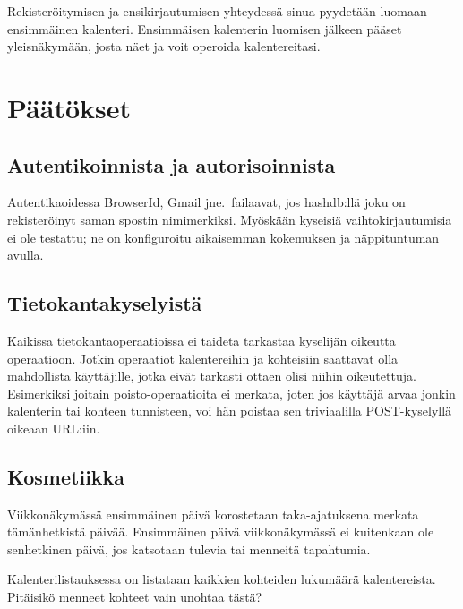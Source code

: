 \documentclass[a4paper,12pt]{report}
\begin{document}
Rekisteröitymisen ja ensikirjautumisen yhteydessä sinua pyydetään luomaan
ensimmäinen kalenteri. Ensimmäisen kalenterin luomisen jälkeen pääset
yleisnäkymään, josta näet ja voit operoida kalentereitasi.

\chapter{Päätökset}


\section*{Autentikoinnista ja autorisoinnista}
Autentikaoidessa BrowserId, Gmail jne.\ failaavat, jos hashdb:llä joku on
rekisteröinyt saman spostin nimimerkiksi.
Myöskään kyseisiä vaihtokirjautumisia ei ole testattu; ne on konfiguroitu
aikaisemman kokemuksen ja näppituntuman avulla.

\section*{Tietokantakyselyistä}
Kaikissa tietokantaoperaatioissa ei taideta tarkastaa kyselijän oikeutta
operaatioon. Jotkin operaatiot kalentereihin ja kohteisiin saattavat olla
mahdollista käyttäjille, jotka eivät tarkasti ottaen olisi niihin oikeutettuja.
Esimerkiksi joitain poisto-operaatioita ei merkata, joten jos käyttäjä arvaa
jonkin kalenterin tai kohteen tunnisteen, voi hän poistaa sen triviaalilla
POST-kyselyllä oikeaan URL:iin.

\section*{Kosmetiikka}
Viikkonäkymässä ensimmäinen päivä korostetaan taka-ajatuksena merkata
tämänhetkistä päivää. Ensimmäinen päivä viikkonäkymässä ei kuitenkaan ole
senhetkinen päivä, jos katsotaan tulevia tai menneitä tapahtumia.

Kalenterilistauksessa on listataan kaikkien kohteiden lukumäärä kalentereista.
Pitäisikö menneet kohteet vain unohtaa tästä?
\end{document}
